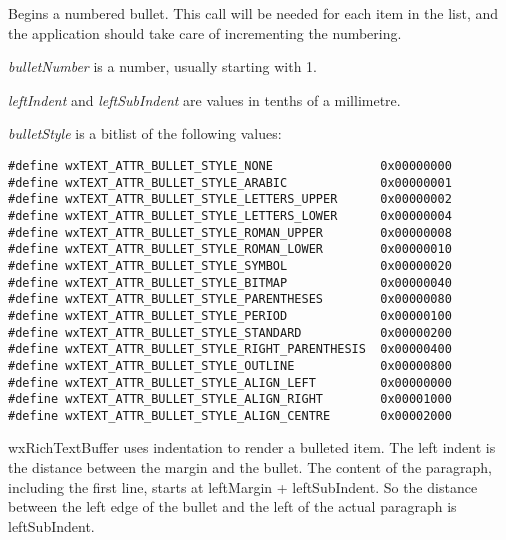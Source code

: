 \label{wxrichtextbufferbeginnumberedbullet}


Begins a numbered bullet. This call will be needed for each item in the list, and the
application should take care of incrementing the numbering.

{\it bulletNumber} is a number, usually starting with 1.

{\it leftIndent} and {\it leftSubIndent} are values in tenths of a millimetre.

{\it bulletStyle} is a bitlist of the following values:

{\small
\begin{verbatim}
#define wxTEXT_ATTR_BULLET_STYLE_NONE               0x00000000
#define wxTEXT_ATTR_BULLET_STYLE_ARABIC             0x00000001
#define wxTEXT_ATTR_BULLET_STYLE_LETTERS_UPPER      0x00000002
#define wxTEXT_ATTR_BULLET_STYLE_LETTERS_LOWER      0x00000004
#define wxTEXT_ATTR_BULLET_STYLE_ROMAN_UPPER        0x00000008
#define wxTEXT_ATTR_BULLET_STYLE_ROMAN_LOWER        0x00000010
#define wxTEXT_ATTR_BULLET_STYLE_SYMBOL             0x00000020
#define wxTEXT_ATTR_BULLET_STYLE_BITMAP             0x00000040
#define wxTEXT_ATTR_BULLET_STYLE_PARENTHESES        0x00000080
#define wxTEXT_ATTR_BULLET_STYLE_PERIOD             0x00000100
#define wxTEXT_ATTR_BULLET_STYLE_STANDARD           0x00000200
#define wxTEXT_ATTR_BULLET_STYLE_RIGHT_PARENTHESIS  0x00000400
#define wxTEXT_ATTR_BULLET_STYLE_OUTLINE            0x00000800
#define wxTEXT_ATTR_BULLET_STYLE_ALIGN_LEFT         0x00000000
#define wxTEXT_ATTR_BULLET_STYLE_ALIGN_RIGHT        0x00001000
#define wxTEXT_ATTR_BULLET_STYLE_ALIGN_CENTRE       0x00002000
\end{verbatim}
}

wxRichTextBuffer uses indentation to render a bulleted item. The left indent is the distance between
the margin and the bullet. The content of the paragraph, including the first line, starts
at leftMargin + leftSubIndent. So the distance between the left edge of the bullet and the
left of the actual paragraph is leftSubIndent.

\label{wxrichtextbufferbeginparagraphspacing}


